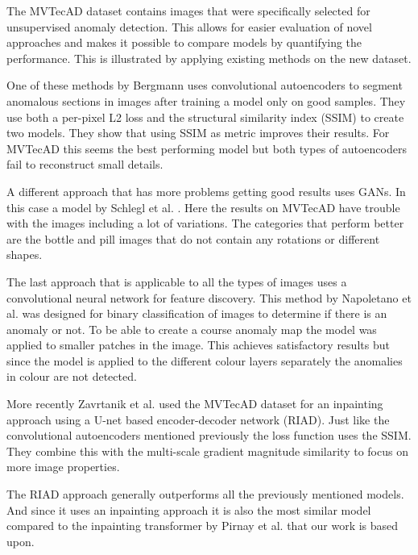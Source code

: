The MVTecAD dataset contains images that were specifically selected for unsupervised anomaly detection. This allows for easier evaluation of novel approaches and makes it possible to compare models by quantifying the performance. This is illustrated by applying existing methods on the new dataset.

One of these methods by Bergmann \cite{bergmann_improving_2019} uses convolutional autoencoders to segment anomalous sections in images after training a model only on good samples. They use both a per-pixel L2 loss and the structural similarity index (SSIM) to create two models. They show that using SSIM as metric improves their results. For MVTecAD this seems the best performing model but both types of autoencoders fail to reconstruct small details.

A different approach that has more problems getting good results uses GANs. In this case a model by Schlegl et al. \cite{schlegl_unsupervised_2017}. Here the results on MVTecAD have trouble with the images including a lot of variations. The categories that perform better are the bottle and pill images that do not contain any rotations or different shapes.

The last approach that is applicable to all the types of images uses a convolutional neural network for feature discovery. This method by Napoletano et al. \cite{napoletano_anomaly_2018}   was designed for binary classification of images to determine if there is an anomaly or not. To be able to create a course anomaly map the model was applied to smaller patches in the image. This achieves satisfactory results but since the model is applied to the different colour layers separately the anomalies in colour are not detected.

More recently Zavrtanik et al. \cite{zavrtanik_reconstruction_2021} used the MVTecAD dataset for an inpainting approach using a U-net based encoder-decoder network (RIAD). Just like the convolutional autoencoders mentioned previously the loss function uses the SSIM. They combine this with the multi-scale gradient magnitude similarity \cite{xue_gradient_2014} to focus on more image properties.

The RIAD approach generally outperforms all the previously mentioned models. And since it uses an inpainting approach it is also the most similar model compared to the inpainting transformer by Pirnay et al. \cite{pirnay_inpainting_2021} that our work is based upon.


